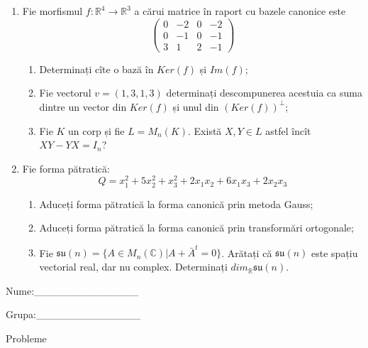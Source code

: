 \documentclass{article}
\begin{document}
\begin{enumerate}
 \item Fie morfismul $f:\mathbb{R}^4 \to \mathbb{R}^3$ a cărui matrice în raport cu bazele canonice este
$$\begin{pmatrix}
0&-2&0&-2\\
0&-1&0&-1\\
3&1&2&-1
\end{pmatrix}$$

\begin{enumerate}
\item Determinați cîte o bază în $Ker(f)$ și $Im(f)$;
\item Fie vectorul $v=(1,3,1,3)$ determinați descompunerea acestuia ca suma dintre un vector din $Ker(f)$ și unul din $(Ker(f))^\perp$;
\item Fie $K$ un corp și fie $L=M_n(K)$. Există $X,Y \in L$ astfel încît $XY-YX=I_n$?  
\end{enumerate}
\item Fie forma pătratică:
$$Q= x_1^2+5x_2^2+x_3^2+2x_1x_2+6x_1x_3+2x_2x_3$$

\begin{enumerate}
\item Aduceți forma pătratică la forma canonică prin metoda Gauss;
\item Aduceți forma pătratică la forma canonică prin transformări ortogonale;
\item Fie $\mathfrak{su}(n)=\{ A \in M_n(\mathbb{C}) | A+\bar{A}^t=0\}$. Arătați că $\mathfrak{su}(n)$ este spațiu vectorial real, dar nu complex.
Determinați $dim_{\mathbb{R}}\mathfrak{su}(n)$.
\end{enumerate}
\end{enumerate}
\newpage
\begin{flushright}
Nume:\_\_\_\_\_\_\_\_\_\_\_\_\_\_
 
 
Grupa:\_\_\_\_\_\_\_\_\_\_\_\_\_\_
\end{flushright}
\begin{center}
\vspace{2cm}
{\Large Probleme}
\vspace{2cm}
\end{center}
\end{document}
